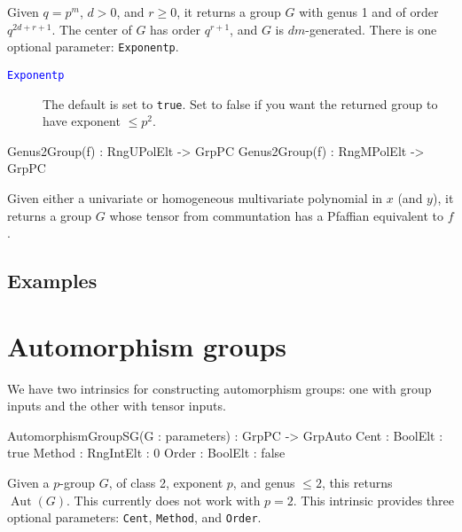 \documentclass{documentation}
\DeclareMathOperator{\Aut}{Aut}
\begin{document}
Given $q=p^m$, $d>0$, and $r\geq 0$, it returns a group $G$ with genus 1 and of order $q^{2d+r+1}$.
The center of $G$ has order $q^{r+1}$, and $G$ is $dm$-generated.
There is one optional parameter: {\tt Exponentp}. 

\begin{description}
\item[\textcolor{blue}{\tt Exponentp}]
The default is set to {\tt true}.
Set to false if you want the returned group to have exponent $\leq p^2$.  
\end{description}

\begin{intrinsics}
Genus2Group(f) : RngUPolElt -> GrpPC
Genus2Group(f) : RngMPolElt -> GrpPC
\end{intrinsics}

Given either a univariate or homogeneous multivariate polynomial in $x$ (and $y$), it returns a group $G$ whose tensor from communtation has a Pfaffian equivalent to $f$.

\section{Examples}

\chapter{Automorphism groups}

We have two intrinsics for constructing automorphism groups: one with group inputs and the other with tensor inputs. 

\begin{intrinsics}
AutomorphismGroupSG(G : parameters) : GrpPC -> GrpAuto
    Cent : BoolElt : true
    Method : RngIntElt : 0 
    Order : BoolElt : false
\end{intrinsics}

Given a $p$-group $G$, of class 2, exponent $p$, and genus $\leq 2$, this returns $\Aut(G)$.
This currently does not work with $p=2$.
This intrinsic provides three optional parameters: {\tt Cent}, {\tt Method}, and {\tt Order}.
\end{document}
